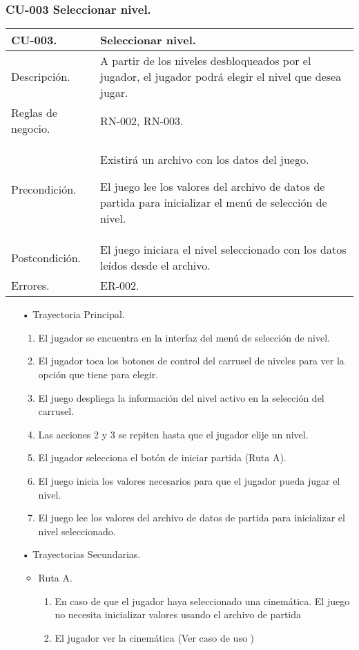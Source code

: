 \subsubsection{CU-003 Seleccionar nivel.} \label{CU:03}
\begin{longtable}[c]{ | m{5cm} | m{10cm}|} 
		\hline
		\rowcolor{cyan}CU-003. & Seleccionar nivel. \\ 
		\hline
		Descripción. & A partir de los niveles desbloqueados por el jugador, el jugador podrá elegir el nivel que desea jugar.\\ 
		\hline
		Reglas de negocio. & RN-002, RN-003.\\ 
		\hline
		Precondición. & Existirá un archivo con los datos del juego.\par
El juego lee los valores del archivo de datos de partida para inicializar el menú de selección de nivel.
 \\
		\hline
		Postcondición. & El juego iniciara el nivel seleccionado con los datos leídos desde el archivo.\\
		\hline
		Errores. & ER-002.\\
		\hline
\end{longtable}
\begin{itemize}
	\item[•] Trayectoria Principal.
		\begin{enumerate}
			\item El jugador se encuentra en la interfaz del menú de selección de nivel. 
			\item El jugador toca los botones de control del carrusel de niveles para ver la opción que tiene para elegir.
			\item El juego despliega la información del nivel activo en la selección del carrusel.
			\item Las acciones 2 y 3 se repiten hasta que el jugador elije un nivel.
			\item El jugador selecciona el botón de iniciar partida (Ruta A).
			\item El juego inicia los valores necesarios para que el jugador pueda jugar el nivel. 
			\item El juego lee los valores del archivo de datos de partida para inicializar el nivel seleccionado.
		\end{enumerate}
	\item[•] Trayectorias Secundarias.
		\begin{itemize}
			\item Ruta A. 
				\begin{enumerate}
					\item En caso de que el jugador haya seleccionado una cinemática. El juego no necesita inicializar valores usando el archivo de partida 
					\item El jugador ver la cinemática (Ver caso de uso )

				\end{enumerate}
		\end{itemize}
\end{itemize}